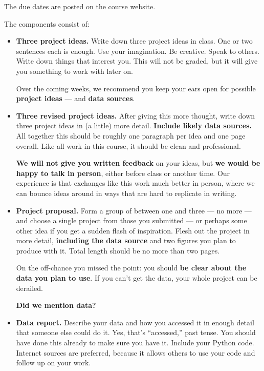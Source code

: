 \documentclass[11pt]{article}
\begin{document}
The due dates are posted on the {course website}.


The components consist of:
\begin{itemize}

\item {\bf Three project ideas.}
Write down three project ideas in class.
One or two sentences each is enough.
Use your imagination.  Be creative.  Speak to others.
Write down things that interest you.
This will not be graded, but it will give you something to work with later on.

Over the coming weeks, we recommend you keep your ears open for possible
{\bf project ideas} --- and {\bf data sources\/}.


\item {\bf Three revised project ideas.}
After giving this more thought, write down three project ideas in (a little) more detail.
{\bf Include likely data sources.}
All together this should be roughly one paragraph per idea and one page overall.
Like all work in this course, it should be clean and professional.

{\bf We will not give you written feedback} on your ideas,
but {\bf we would be happy to talk in person}, either before class or another time.
Our experience is that exchanges like this work much better in person,
where we can bounce ideas around in ways that are hard to replicate in writing.

\item{\bf Project proposal.}
Form a group of between one and three --- no more ---
and choose a single project from those you submitted ---
or perhaps some other idea if you get a sudden flash of inspiration.
Flesh out the project in more detail, {\bf including the data source\/} and
two figures you plan to produce with it.
Total length should be no more than two pages.

On the off-chance you missed the point:  you should {\bf be clear about the data you plan to use\/}.
If you can't get the data, your whole project can be derailed.

{\bf Did we mention data?}

\item {\bf Data report.}
Describe your data and how you accessed it in enough detail that someone else could do it.
Yes, that's ``accessed,'' past tense.  You should have done this already to make sure you have it.
Include your Python code.  %
Internet sources are preferred, because it allows others to use your code and
follow up on your work.


\end{itemize}
\end{document}
